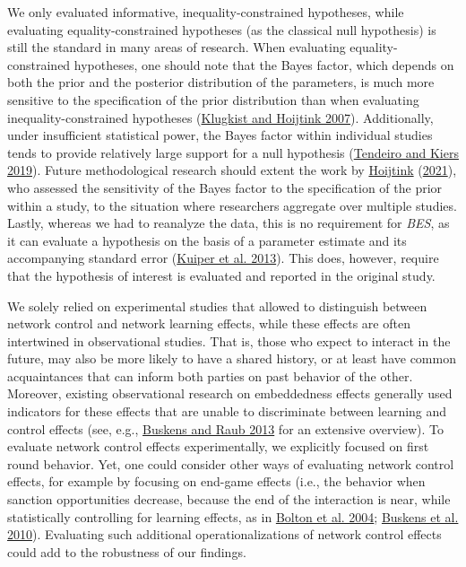 \documentclass[
  11pt,
]{article}
\begin{document}
We only evaluated informative, inequality-constrained hypotheses, while evaluating equality-constrained hypotheses (as the classical null hypothesis) is still the standard in many areas of research.
When evaluating equality-constrained hypotheses, one should note that the Bayes factor, which depends on both the prior and the posterior distribution of the parameters, is much more sensitive to the specification of the prior distribution than when evaluating inequality-constrained hypotheses (\protect\hyperlink{ref-klugkist_bf_2007}{Klugkist and Hoijtink 2007}).
Additionally, under insufficient statistical power, the Bayes factor within individual studies tends to provide relatively large support for a null hypothesis (\protect\hyperlink{ref-tendeiro_kiers_2019}{Tendeiro and Kiers 2019}).
Future methodological research should extent the work by \protect\hyperlink{ref-hoijtink_prior_2021}{Hoijtink} (\protect\hyperlink{ref-hoijtink_prior_2021}{2021}), who assessed the sensitivity of the Bayes factor to the specification of the prior within a study, to the situation where researchers aggregate over multiple studies.
Lastly, whereas we had to reanalyze the data, this is no requirement for \emph{BES}, as it can evaluate a hypothesis on the basis of a parameter estimate and its accompanying standard error (\protect\hyperlink{ref-kuiper_combining_2013}{Kuiper et al. 2013}).
This does, however, require that the hypothesis of interest is evaluated and reported in the original study.

We solely relied on experimental studies that allowed to distinguish between network control and network learning effects, while these effects are often intertwined in observational studies.
That is, those who expect to interact in the future, may also be more likely to have a shared history, or at least have common acquaintances that can inform both parties on past behavior of the other.
Moreover, existing observational research on embeddedness effects generally used indicators for these effects that are unable to discriminate between learning and control effects (see, e.g., \protect\hyperlink{ref-buskens_raub_handbook_2013}{Buskens and Raub 2013} for an extensive overview).
To evaluate network control effects experimentally, we explicitly focused on first round behavior.
Yet, one could consider other ways of evaluating network control effects, for example by focusing on end-game effects (i.e., the behavior when sanction opportunities decrease, because the end of the interaction is near, while statistically controlling for learning effects, as in \protect\hyperlink{ref-bolton_electronic_2004}{Bolton et al. 2004}; \protect\hyperlink{ref-buskens_raub_veer_triads_2010}{Buskens et al. 2010}).
Evaluating such additional operationalizations of network control effects could add to the robustness of our findings.
\end{document}
